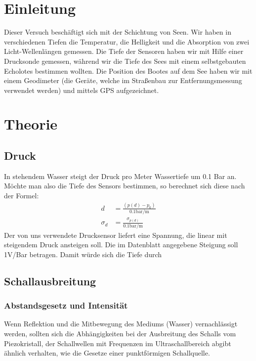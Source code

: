 \documentclass[12pt,a4paper,titlepage,headinclude,bibtotoc]{scrartcl}
\begin{document}
\setcounter{footnote}{0}
\setcounter{page}{1}
\section{Einleitung}
\label{sec:einleitung}
\cite{demtroeder}
Dieser Versuch beschäftigt sich mit der Schichtung von Seen.
Wir haben in verschiedenen Tiefen die Temperatur, die Helligkeit und die Absorption von zwei Licht-Wellenlängen gemessen.
Die Tiefe der Sensoren haben wir mit Hilfe einer Drucksonde gemessen, während wir die Tiefe des Sees mit einem selbstgebauten Echolotes bestimmen wollten.
Die Position des Bootes auf dem See haben wir mit einem Geodimeter (die Geräte, welche im Straßenbau zur Entfernungsmessung verwendet werden) und mittels GPS aufgezeichnet.


\section{Theorie}
\label{sec:theorie}
\subsection{Druck}
In stehendem Wasser steigt der Druck pro Meter Wassertiefe um 0.1 Bar an.
Möchte man also die Tiefe des Sensors bestimmen, so berechnet sich diese nach der Formel:
\begin{align}
	d&=\frac{(p(d)-p_0)}{0.1\si{\bar \per\metre}} \label{eq:d}\\
	\sigma_d &= \frac{\sigma_{p(d)}}{0.1\si{\bar \per\metre}}
\end{align}
Der von uns verwendete Drucksensor liefert eine Spannung, die linear mit steigendem Druck ansteigen soll.
Die im Datenblatt angegebene Steigung soll 1V/Bar betragen.
Damit würde sich die Tiefe durch








\subsection{Schallausbreitung}

\subsubsection{Abstandsgesetz und Intensität}

Wenn Reflektion und die Mitbewegung des Mediums (Wasser) vernachlässigt werden, sollten sich die Abhängigkeiten bei der Ausbreitung des Schalls vom Piezokristall, der Schallwellen mit Frequenzen im Ultraschallbereich abgibt
ähnlich verhalten, wie die Gesetze einer punktförmigen Schallquelle. 
\end{document}
